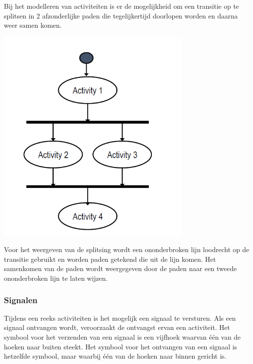 Bij het modelleren van activiteiten is er de mogelijkheid om een transitie op te splitsen in 2 afzonderlijke paden die tegelijkertijd doorlopen worden en daarna weer samen komen.


\begin{center}
\includegraphics[width=3.8in]{img/parallelism}%
\end{center}

Voor het weergeven van de splitsing wordt een ononderbroken lijn loodrecht op de transitie gebruikt en worden paden getekend die uit de lijn komen. Het samenkomen van de paden wordt weergegeven door de paden naar een tweede ononderbroken lijn te laten wijzen.

\subsubsection{Signalen}

Tijdens een reeks activiteiten is het mogelijk een signaal te versturen. Als een signaal ontvangen wordt, veroorzaakt de ontvangst ervan een activiteit.
Het symbool voor het verzenden van een signaal is een vijfhoek waarvan één van de hoeken naar buiten steekt. Het symbool voor het ontvangen van een signaal is hetzelfde symbool, maar waarbij één van de hoeken naar binnen gericht is.


